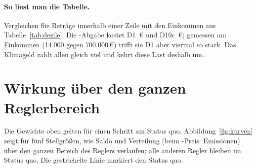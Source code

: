 \paragraph{So liest man die Tabelle.} Vergleichen Sie Beträge innerhalb einer Zeile mit den
Einkommen aus Tabelle~\ref{tab:dezile}: Die \COz-Abgabe kostet D1 \,\euro{}
und D10c \,\euro{}; gemessen am Einkommen (14.000 gegen 700.000\,\euro)
trifft sie D1 aber viermal so stark. Das Klimageld zahlt allen gleich viel und kehrt diese
Last deshalb um.

\section{Wirkung über den ganzen Reglerbereich}
\label{sec:kurven}

Die Gewichte oben gelten für einen Schritt am Status quo. Abbildung~\ref{fig:kurven} zeigt
für fünf Stellgrößen, wie Saldo und Verteilung (beim \COz-Preis: Emissionen) über den
ganzen Bereich des Reglers verlaufen; alle anderen Regler bleiben im Status quo. Die
gestrichelte Linie markiert den Status quo.

\newcommand{\kurve}[6]{%
  \nextgroupplot[title={#5}, xlabel={#3}, ylabel={#4},
    extra x ticks={\wert{sq}{#1}{x}}, extra x tick labels={},
    extra x tick style={grid=major, major grid style={dashed, grau}}]
  \addplot[color=#6, very thick, mark=none] table[x=x, y=#2] {generiert/verlauf_#1.dat};}

